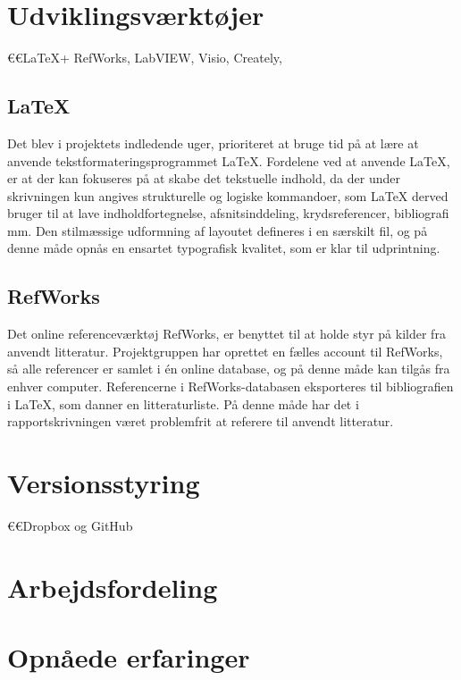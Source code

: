 \section{Udviklingsværktøjer}
	€€LaTeX+ RefWorks, LabVIEW, Visio, Creately, 

	\subsection{\LaTeX}
Det blev i projektets indledende uger, prioriteret at bruge tid på at lære at anvende tekstformateringsprogrammet \LaTeX. Fordelene ved at anvende LaTeX, er at der kan fokuseres på at skabe det tekstuelle indhold, da der under skrivningen kun angives strukturelle og logiske kommandoer, som LaTeX derved bruger til at lave indholdfortegnelse, afsnitsinddeling, krydsreferencer, bibliografi mm. Den stilmæssige udformning af layoutet defineres i en særskilt fil, og på denne måde opnås en ensartet typografisk kvalitet, som er klar til udprintning.   
	\subsection{RefWorks}
Det online referenceværktøj RefWorks, er benyttet til at holde styr på kilder fra anvendt litteratur. Projektgruppen har oprettet en fælles account til RefWorks, så alle referencer er samlet i én online database, og på denne måde kan tilgås fra enhver computer. Referencerne i RefWorks-databasen eksporteres til bibliografien i LaTeX, som danner en litteraturliste. På denne måde har det i rapportskrivningen været problemfrit at referere til anvendt litteratur.  
	
	



\section{Versionsstyring}
 	€€Dropbox og GitHub

\section{Arbejdsfordeling}

\section{Opnåede erfaringer}